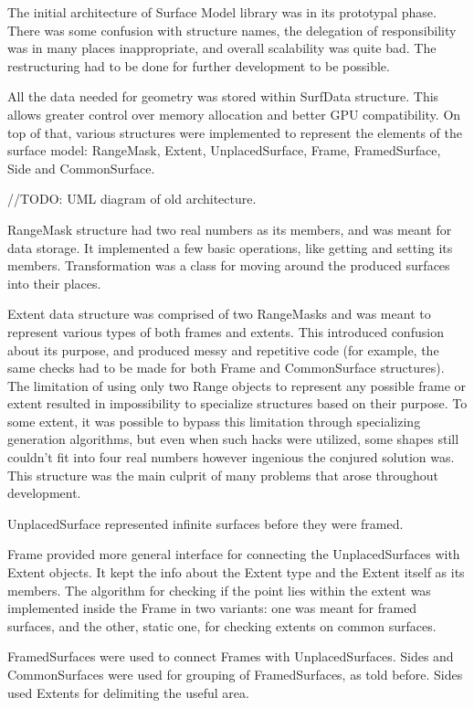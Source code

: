 \documentclass[12pt, a4paper]{article}
\begin{document}
The initial architecture of Surface Model library was in its prototypal phase. There was some confusion with structure names, the delegation of responsibility was in many places inappropriate, and overall scalability was quite bad. The restructuring had to be done for further development to be possible.

All the data needed for geometry was stored within SurfData structure. This allows greater control over memory allocation and better GPU compatibility. On top of that, various structures were implemented to represent the elements of the surface model: RangeMask, Extent, UnplacedSurface, Frame, FramedSurface, Side and CommonSurface.

//TODO: UML diagram of old architecture.

RangeMask structure had two real numbers as its members, and was meant for data storage. It implemented a few basic operations, like getting and setting its members. Transformation was a class for moving around the produced surfaces into their places.

Extent data structure was comprised of two RangeMasks and was meant to represent various types of both frames and extents. This introduced confusion about its purpose, and produced messy and repetitive code (for example, the same checks had to be made for both Frame and CommonSurface structures). The limitation of using only two Range objects to represent any possible frame or extent resulted in impossibility to specialize structures based on their purpose. To some extent, it was possible to bypass this limitation through specializing generation algorithms, but even when such hacks were utilized, some shapes still couldn't fit into four real numbers however ingenious the conjured solution was. This structure was the main culprit of many problems that arose throughout development.

UnplacedSurface represented infinite surfaces before they were framed.

Frame provided more general interface for connecting the UnplacedSurfaces with Extent objects. It kept the info about the Extent type and the Extent itself as its members. The algorithm for checking if the point lies within the extent was implemented inside the Frame in two variants: one was meant for framed surfaces, and the other, static one, for checking extents on common surfaces.

FramedSurfaces were used to connect Frames with UnplacedSurfaces. Sides and CommonSurfaces were used for grouping of FramedSurfaces, as told before. Sides used Extents for delimiting the useful area.
\end{document}
